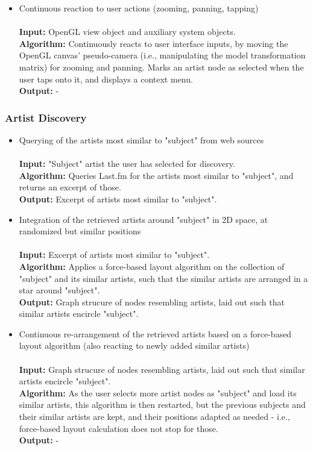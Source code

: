 \begin{itemize}
	\item Continuous reaction to user actions (zooming, panning, tapping) \\\\
				\textbf{Input:} OpenGL view object and auxiliary system objects. \\
				\textbf{Algorithm:} Continuously reacts to user interface inputs, by moving the OpenGL canvas'
				pseudo-camera (i.e., manipulating the model transformation matrix) for zooming and panning.
				Marks an artist node as selected when the user taps onto it, and displays a context menu. \\
				\textbf{Output:} -
\end{itemize}

\subsubsection{Artist Discovery}

\begin{itemize}
	\item Querying of the artists most similar to "subject" from web sources \\\\
				\textbf{Input:} "Subject" artist the user has selected for discovery. \\
				\textbf{Algorithm:} Queries Last.fm for the artists most similar to "subject", and returns
				an excerpt of those. \\
				\textbf{Output:} Excerpt of artists most similar to "subject". \\
	\item Integration of the retrieved artists around "subject" in 2D space, at randomized but similar positions \\\\
				\textbf{Input:} Excerpt of artists most similar to "subject". \\
				\textbf{Algorithm:} Applies a force-based layout algorithm on the collection of "subject" and
				its similar artists, such that the similar artists are arranged in a star around "subject". \\
				\textbf{Output:} Graph strucure of nodes resembling artists, laid out such that similar
				artists encircle "subject". \\
	\item Continuous re-arrangement of the retrieved artists based on a force-based layout algorithm (also reacting to newly added similar artists) \\\\
				\textbf{Input:} Graph strucure of nodes resembling artists, laid out such that similar
				artists encircle "subject". \\
				\textbf{Algorithm:} As the user selects more artist nodes as "subject" and load
				its similar artists, this algorithm is then restarted, but the previous subjects and their
				similar artists are kept, and their positions adapted as needed - i.e., force-based layout
				calculation does not stop for those. \\
				\textbf{Output:} - \\
\end{itemize}

